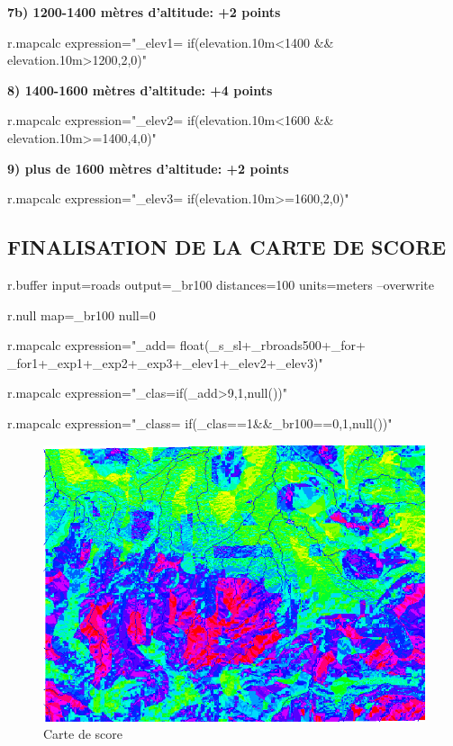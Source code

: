 \noindent \textbf{
7b) 1200-1400 m\`etres d'altitude: +2 points}
\begin{smallverbatim}
r.mapcalc expression="_elev1=
if(elevation.10m<1400 && elevation.10m>1200,2,0)"
\end{smallverbatim}

\noindent \textbf{
8) 1400-1600 m\`etres d'altitude: +4 points}
\begin{smallverbatim}
r.mapcalc expression="_elev2=
if(elevation.10m<1600 && elevation.10m>=1400,4,0)"
\end{smallverbatim}

\noindent \textbf{
9) plus de 1600 m\`etres d'altitude: +2 points}
\begin{smallverbatim}
r.mapcalc expression="_elev3=
if(elevation.10m>=1600,2,0)"
\end{smallverbatim}

\subsection{FINALISATION DE LA CARTE DE SCORE}

\begin{smallverbatim}
r.buffer input=roads output=_br100
 distances=100 units=meters --overwrite

r.null map=_br100 null=0

r.mapcalc expression="_add=
float(_s_sl+_rbroads500+_for+
 _for1+_exp1+_exp2+_exp3+_elev1+_elev2+_elev3)"

r.mapcalc expression="_clas=if(_add>9,1,null())"

r.mapcalc expression="_class=
if(_clas==1&&_br100==0,1,null())"
\end{smallverbatim}

\begin{figure}[htbp]
   \centering
   \includegraphics[scale=0.35]{grass021.png}
   \caption{Carte de score}
   \label{fig:grass021}
\end{figure}

